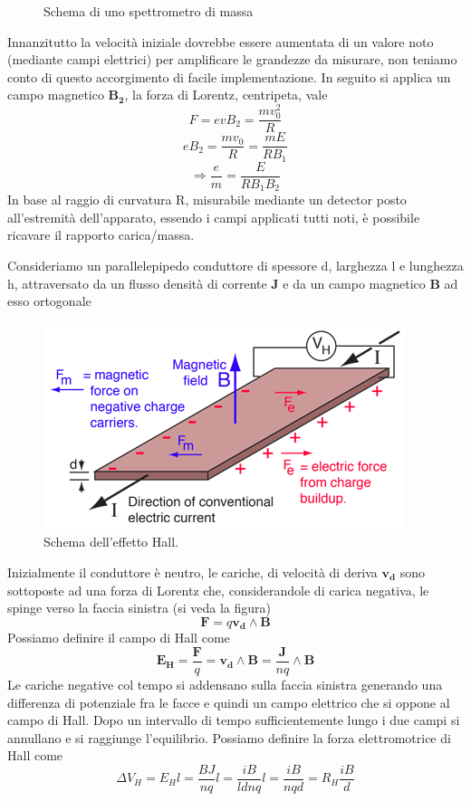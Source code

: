 \documentclass[
10pt, %
a4paper, %
oneside, %
headinclude,footinclude, %
BCOR5mm, %
]{scrartcl}
\begin{document}
\begin{applicazione}
\begin{figure}[h!]
	\caption{Schema di uno spettrometro di massa}
	\label{fig:spettrometro}
\end{figure}
\FloatBarrier
Innanzitutto la velocità iniziale dovrebbe essere aumentata di un valore noto (mediante campi elettrici) per amplificare le grandezze da misurare, non teniamo conto di questo accorgimento di facile implementazione. In seguito si applica un campo magnetico $\mathbf{B_2}$, la forza di Lorentz, centripeta, vale
\[F = evB_2= \frac{mv_0^2}{R}\]
\[eB_2 = \frac{mv_0}{R}= \frac{mE}{RB_1} \]
\[\Rightarrow \frac{e}{m}= \frac{E}{RB_1B_2}\]
In base al raggio di curvatura R, misurabile mediante un detector posto all'estremità dell'apparato, essendo i campi applicati tutti noti, è possibile ricavare il rapporto carica/massa.
\end{applicazione}
\begin{applicazione}
	Consideriamo un parallelepipedo conduttore di spessore d, larghezza l e lunghezza h, attraversato da un flusso densità di corrente $\mathbf{J}$ e da un campo magnetico \(\mathbf{B}\) ad esso ortogonale
\begin{figure}[h!]
	\centering
	\includegraphics[width=0.6\linewidth]{../images/hall_effect}
	\caption{Schema dell'effetto Hall.}
	\label{fig:halleffect}
\end{figure}
\FloatBarrier
Inizialmente il conduttore è neutro, le cariche, di velocità di deriva $\mathbf{v_d}$ sono sottoposte ad una forza di Lorentz che, considerandole di carica negativa, le spinge verso la faccia sinistra (si veda la figura)
\[\mathbf{F}= q\mathbf{v_d}\wedge\mathbf{B}\] 
Possiamo definire il campo di Hall come
\[\mathbf{E_H}=\frac{\mathbf{F}}{q}=\mathbf{v_d}\wedge\mathbf{B}=\frac{\mathbf{J}}{nq}\wedge\mathbf{B}\]
Le cariche negative col tempo si addensano sulla faccia sinistra generando una differenza di potenziale fra le facce e quindi un campo elettrico che si oppone al campo di Hall. Dopo un intervallo di tempo sufficientemente lungo i due campi si annullano e si raggiunge l'equilibrio. Possiamo definire la forza elettromotrice di Hall come
\[\Delta V_H = E_H l =\frac{BJ}{nq}l =\frac{iB}{ldnq}l=\frac{i B}{nqd} = R_H \frac{iB}{d}\] 

\end{applicazione}
\end{document}
